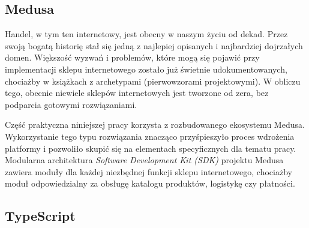 %

%
%
%

\subsection{Medusa}\label{subsec:medusa}

Handel, w tym ten internetowy, jest obecny w naszym życiu od dekad.
Przez swoją bogatą historię stał się jedną z najlepiej opisanych i najbardziej dojrzałych domen.
Większość wyzwań i problemów, które mogą się pojawić przy implementacji sklepu internetowego zostało już świetnie udokumentowanych, chociażby w książkach z archetypami (pierwowzorami projektowymi).
W obliczu tego, obecnie niewiele sklepów internetowych jest tworzone od zera, bez podparcia gotowymi rozwiązaniami.

Część praktyczna niniejszej pracy korzysta z rozbudowanego ekosystemu Medusa\cite{medusajs-home}.
Wykorzystanie tego typu rozwiązania znacząco przyśpieszyło proces wdrożenia platformy i pozwoliło skupić się na elementach specyficznych dla tematu pracy.
Modularna architektura \emph{Software Development Kit (SDK)} projektu Medusa zawiera moduły dla każdej niezbędnej funkcji sklepu internetowego, chociażby moduł odpowiedzialny za obsługę katalogu produktów, logistykę czy płatności.

\subsection{TypeScript}\label{subsec:typescript}

